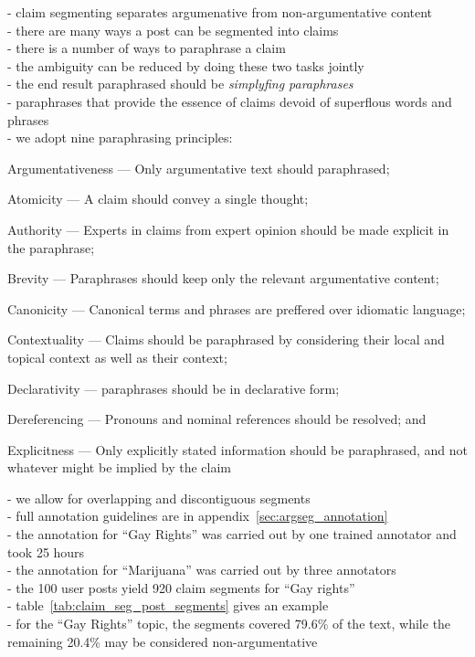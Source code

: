- claim segmenting separates argumenative from non-argumentative content \\
- there are many ways a post can be segmented into claims \\
- there is a number of ways to paraphrase a claim \\
- the ambiguity can be reduced by doing these two tasks jointly \\
- the end result paraphrased should be \emph{simplyfing paraphrases} \\
- paraphrases that provide the essence of claims devoid of 
superflous words and phrases \\
- we adopt nine paraphrasing principles: 
\begin{enumdescript}
\item[Argumentativeness] --- Only argumentative text should paraphrased;
\item[Atomicity] --- A claim should convey a single thought; 
\item[Authority] --- Experts in claims from expert opinion should be made explicit in the
paraphrase; 
\item[Brevity] --- Paraphrases should keep only the relevant argumentative content; 
\item[Canonicity] --- Canonical terms and phrases are preffered over idiomatic language; 
\item[Contextuality] --- Claims should be paraphrased by considering their local and topical
context as well as their context; 
\item[Declarativity] --- paraphrases should be in declarative form; 
\item[Dereferencing] --- Pronouns and nominal references should be resolved; and
\item[Explicitness] --- Only explicitly stated information should be paraphrased, and not
whatever might be implied by the claim 
\end{enumdescript}
- we allow for overlapping and discontiguous segments \\
- full annotation guidelines are in appendix~\ref{sec:argseg_annotation} \\
- the annotation for ``Gay Rights'' was carried out by one trained annotator and took 25 hours\\
- the annotation for ``Marijuana'' was carried out by three annotators \\
- the 100 user posts yield 920 claim segments for ``Gay rights'' \\
- table~\ref{tab:claim_seg_post_segments} gives an example \\
- for the ``Gay Rights'' topic, the segments covered 79.6\% of the text, while the remaining
20.4\% may be considered non-argumentative \\


